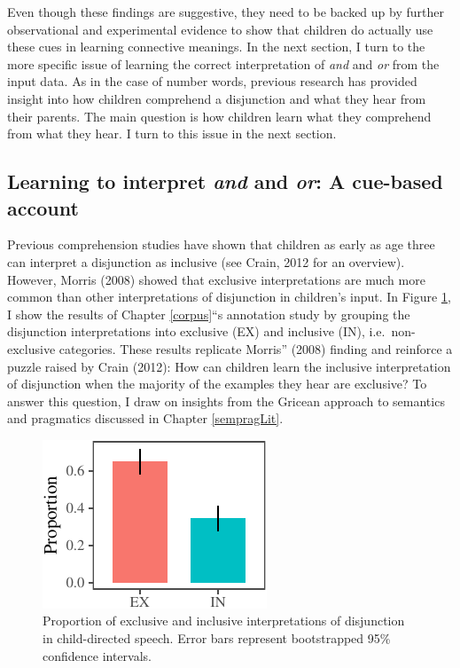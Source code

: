 \documentclass[floatsintext,man]{apa6}
\theoremstyle{definition}
\theoremstyle{definition}
\theoremstyle{definition}
\theoremstyle{remark}
\begin{document}
Even though these findings are suggestive, they need to be backed up by
further observational and experimental evidence to show that children do
actually use these cues in learning connective meanings. In the next
section, I turn to the more specific issue of learning the correct
interpretation of \emph{and} and \emph{or} from the input data. As in
the case of number words, previous research has provided insight into
how children comprehend a disjunction and what they hear from their
parents. The main question is how children learn what they comprehend
from what they hear. I turn to this issue in the next section.

\subsection{\texorpdfstring{Learning to interpret \emph{and} and
\emph{or}: A cue-based
account}{Learning to interpret and and or: A cue-based account}}\label{myaccount}

Previous comprehension studies have shown that children as early as age
three can interpret a disjunction as inclusive (see Crain, 2012 for an
overview). However, Morris (2008) showed that exclusive interpretations
are much more common than other interpretations of disjunction in
children's input. In Figure \ref{fig:interpretation}, I show the results
of Chapter \ref{corpus}\enquote{s annotation study by grouping the
disjunction interpretations into exclusive (EX) and inclusive (IN),
i.e.~non-exclusive categories. These results replicate Morris} (2008)
finding and reinforce a puzzle raised by Crain (2012): How can children
learn the inclusive interpretation of disjunction when the majority of
the examples they hear are exclusive? To answer this question, I draw on
insights from the Gricean approach to semantics and pragmatics discussed
in Chapter \ref{sempragLit}.

\begin{figure}[tb]

{\centering \includegraphics{figs/interpretation-1} 

}

\caption{Proportion of exclusive and inclusive interpretations of disjunction in child-directed speech. Error bars represent bootstrapped 95\% confidence intervals.}\label{fig:interpretation}
\end{figure}
\end{document}
